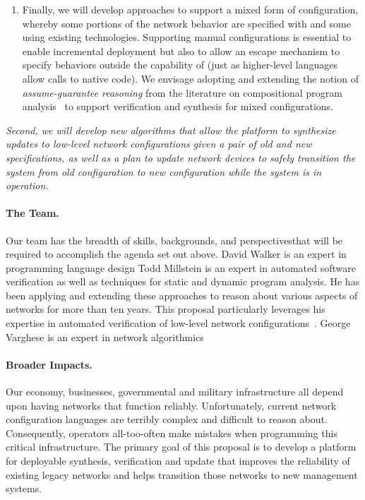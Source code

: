 \begin{enumerate}
\item Finally, we will develop approaches to support a mixed form of configuration, whereby some portions of the network behavior are specified with \Name and some using existing technologies.  Supporting manual configurations is essential to enable incremental deployment but also to allow an escape mechanism to specify behaviors outside the capability of \Name (just as higher-level languages allow calls to native code).  We envisage adopting and extending the notion of {\em assume-guarantee reasoning} from the literature on compositional program analysis~\cite{} to support verification and synthesis for mixed configurations.  
\end{enumerate}

{\em Second, we will develop new algorithms that allow the \Name platform to synthesize
updates to low-level network configurations given a pair of old and new \Name specifications, as well as a \emph{plan} to update network devices to
safely transition the system from old configuration to new configuration while the system is in operation.}

\paragraph{The Team.}  Our team has the breadth of skills, backgrounds, and perspectivesthat will be required to accomplish the agenda set out above.  David Walker is an expert in programming language design   Todd Millstein is an expert in automated software verification as well as techniques for static and dynamic program analysis.  He has been applying and extending these approaches to reason about various aspects of networks for more than ten years.  This proposal particularly leverages his expertise in automated verification of low-level network configurations~\cite{batfish}.  George Varghese is an expert in network algorithmics 

\paragraph{Broader Impacts.}  
Our economy, businesses, governmental and military infrastructure all depend upon having networks that function
reliably.  Unfortunately, current network configuration languages are
terribly complex and difficult to reason about.  Consequently,
operators all-too-often make mistakes when programming this critical
infrastructure.  The primary goal of this proposal is to develop
a platform for deployable synthesis, verification and update that
improves the reliability of existing legacy networks and helps
transition those networks to new management systems.

